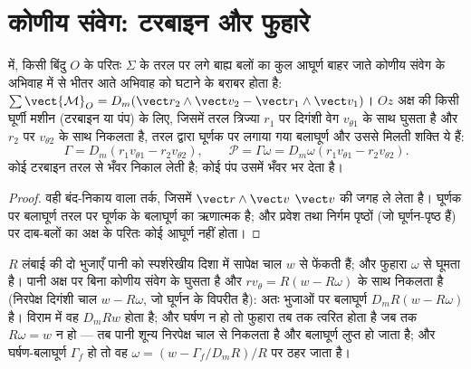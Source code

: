 \section{कोणीय संवेग: टरबाइन और फुहारे}

\begin{theorem}\label{thm:b2:flow-balances:angular}
 में, किसी बिंदु $O$ के परितः $\Sigma$ के तरल पर लगे बाह्य
बलों का कुल आघूर्ण बाहर जाते कोणीय संवेग के अभिवाह में से भीतर आते अभिवाह को
घटाने के बराबर होता है: $\sum\vect{\mathcal M}_O = D_m(\vect r_2\wedge\vect v_2 - \vect r_1
\wedge\vect v_1)$। $Oz$ अक्ष की किसी घूर्णी मशीन (टरबाइन या पंप) के लिए,
जिसमें तरल त्रिज्या $r_1$ पर दिगंशी वेग
$v_{\theta1}$ के साथ घुसता है और $r_2$ पर $v_{\theta2}$ के साथ निकलता है, तरल
द्वारा घूर्णक पर लगाया गया बलाघूर्ण और उससे मिलती शक्ति ये हैं:
\[
\Gamma = D_m(r_1v_{\theta1} - r_2v_{\theta2}) , \qquad
\mathcal P = \Gamma\omega = D_m\omega(r_1v_{\theta1} - r_2v_{\theta2}) .
\]
कोई टरबाइन तरल से भँवर निकाल लेती है; कोई पंप उसमें भँवर भर देता है।
\end{theorem}

\begin{proof}
वही बंद-निकाय वाला तर्क, जिसमें $\vect r\wedge\vect v$ $\vect v$ की जगह
ले लेता है। घूर्णक पर बलाघूर्ण तरल पर घूर्णक के
बलाघूर्ण का ऋणात्मक है; और प्रवेश तथा निर्गम पृष्ठों
(जो घूर्णन-पृष्ठ हैं) पर दाब-बलों का अक्ष के परितः कोई आघूर्ण
नहीं होता।
\end{proof}

\begin{example}[घास का फुहारा]\label{ex:b2:flow-balances:sprinkler}
$R$ लंबाई की दो भुजाएँ पानी को स्पर्शरेखीय दिशा में सापेक्ष चाल
$w$ से फेंकती हैं; और फुहारा $\omega$ से घूमता है। पानी अक्ष पर बिना
कोणीय संवेग के घुसता है और $r v_\theta = R(w - R\omega)$ के साथ निकलता है (निरपेक्ष
दिगंशी चाल $w - R\omega$, जो घूर्णन के विपरीत है): अतः भुजाओं पर बलाघूर्ण
$D_mR(w - R\omega)$ है। विराम में वह $D_mRw$ होता है; और घर्षण न हो तो
फुहारा तब तक त्वरित होता है जब तक $R\omega = w$ न हो --- तब पानी शून्य
निरपेक्ष चाल से निकलता है और बलाघूर्ण लुप्त हो जाता है; और घर्षण-बलाघूर्ण
$\Gamma_f$ हो तो वह $\omega = (w - \Gamma_f/D_mR)/R$ पर ठहर जाता है।
\end{example}

